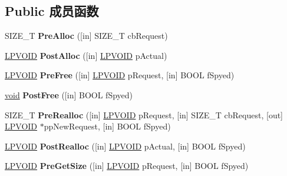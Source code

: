 \subsection*{Public 成员函数}
\begin{DoxyCompactItemize}
\item 
\mbox{\label{interface_i_malloc_spy_a5e8189520eb839cdc55c411c2b1b508e}} 
S\+I\+Z\+E\+\_\+T {\bfseries Pre\+Alloc} (\mbox{[}in\mbox{]} S\+I\+Z\+E\+\_\+T cb\+Request)
\item 
\mbox{\label{interface_i_malloc_spy_aba87918e3099a612e13f63f3396b7dcc}} 
\hyperlink{interfacevoid}{L\+P\+V\+O\+ID} {\bfseries Post\+Alloc} (\mbox{[}in\mbox{]} \hyperlink{interfacevoid}{L\+P\+V\+O\+ID} p\+Actual)
\item 
\mbox{\label{interface_i_malloc_spy_a279ff9ea6c886af762563719734632fa}} 
\hyperlink{interfacevoid}{L\+P\+V\+O\+ID} {\bfseries Pre\+Free} (\mbox{[}in\mbox{]} \hyperlink{interfacevoid}{L\+P\+V\+O\+ID} p\+Request, \mbox{[}in\mbox{]} B\+O\+OL f\+Spyed)
\item 
\mbox{\label{interface_i_malloc_spy_a6946c6ecabca89464edd24518b83ea43}} 
\hyperlink{interfacevoid}{void} {\bfseries Post\+Free} (\mbox{[}in\mbox{]} B\+O\+OL f\+Spyed)
\item 
\mbox{\label{interface_i_malloc_spy_aa7b72c3a2182970bd8f145cc90689a67}} 
S\+I\+Z\+E\+\_\+T {\bfseries Pre\+Realloc} (\mbox{[}in\mbox{]} \hyperlink{interfacevoid}{L\+P\+V\+O\+ID} p\+Request, \mbox{[}in\mbox{]} S\+I\+Z\+E\+\_\+T cb\+Request, \mbox{[}out\mbox{]} \hyperlink{interfacevoid}{L\+P\+V\+O\+ID} $\ast$pp\+New\+Request, \mbox{[}in\mbox{]} B\+O\+OL f\+Spyed)
\item 
\mbox{\label{interface_i_malloc_spy_ad8db364a89eccc00da6914bbee69d0e9}} 
\hyperlink{interfacevoid}{L\+P\+V\+O\+ID} {\bfseries Post\+Realloc} (\mbox{[}in\mbox{]} \hyperlink{interfacevoid}{L\+P\+V\+O\+ID} p\+Actual, \mbox{[}in\mbox{]} B\+O\+OL f\+Spyed)
\item 
\mbox{\label{interface_i_malloc_spy_ae13efe5769b9326c0248c481922506e7}} 
\hyperlink{interfacevoid}{L\+P\+V\+O\+ID} {\bfseries Pre\+Get\+Size} (\mbox{[}in\mbox{]} \hyperlink{interfacevoid}{L\+P\+V\+O\+ID} p\+Request, \mbox{[}in\mbox{]} B\+O\+OL f\+Spyed)

\end{DoxyCompactItemize}
